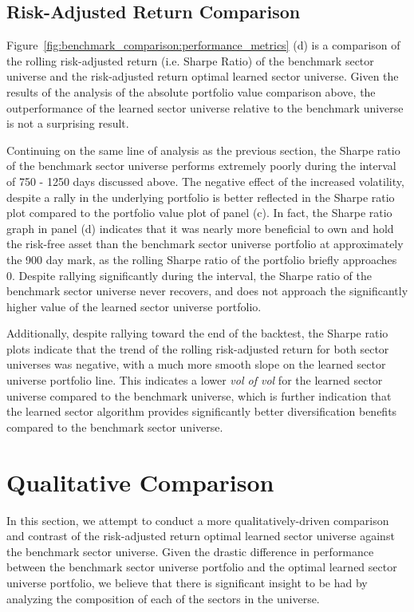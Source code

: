 \documentclass[../main.tex]{subfiles}
\begin{document}
\subsection{Risk-Adjusted Return Comparison}

Figure~\ref{fig:benchmark_comparison:performance_metrics} (d) is a comparison of the rolling risk-adjusted return (i.e. Sharpe Ratio) of the benchmark sector universe and the risk-adjusted return optimal learned sector universe. Given the results of the analysis of the absolute portfolio value comparison above, the outperformance of the learned sector universe relative to the benchmark universe is not a surprising result.

Continuing on the same line of analysis as the previous section, the Sharpe ratio of the benchmark sector universe performs extremely poorly during the interval of 750 - 1250 days discussed above. The negative effect of the increased volatility, despite a rally in the underlying portfolio is better reflected in the Sharpe ratio plot compared to the portfolio value plot of panel (c). In fact, the Sharpe ratio graph in panel (d) indicates that it was nearly more beneficial to own and hold the risk-free asset than the benchmark sector universe portfolio at approximately the 900 day mark, as the rolling Sharpe ratio of the portfolio briefly approaches 0. Despite rallying significantly during the interval, the Sharpe ratio of the benchmark sector universe never recovers, and does not approach the significantly higher value of the learned sector universe portfolio.

Additionally, despite rallying toward the end of the backtest, the Sharpe ratio plots indicate that the trend of the rolling risk-adjusted return for both sector universes was negative, with a much more smooth slope on the learned sector universe portfolio line. This indicates a lower \textit{vol of vol} for the learned sector universe compared to the benchmark universe, which is further indication that the learned sector algorithm provides significantly better diversification benefits compared to the benchmark sector universe.

\section{Qualitative Comparison}

In this section, we attempt to conduct a more qualitatively-driven comparison and contrast of the risk-adjusted return optimal learned sector universe against the benchmark sector universe. Given the drastic difference in performance between the benchmark sector universe portfolio and the optimal learned sector universe portfolio, we believe that there is significant insight to be had by analyzing the composition of each of the sectors in the universe.
\end{document}
